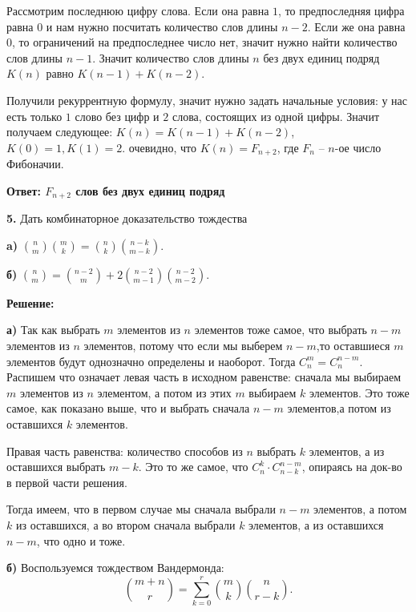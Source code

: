 \documentclass[a4paper,12pt]{article} %
\begin{document}
Рассмотрим последнюю цифру слова. Если она равна $1$, то предпоследняя цифра равна $0$ и нам нужно посчитать количество слов длины $n-2$. Если же она равна $0$, то ограничений на предпоследнее число нет, значит нужно найти количество слов длины $n-1$. Значит количество слов длины $n$ без двух единиц подряд $K(n)$ равно $K(n-1) + K(n-2)$.

Получили рекуррентную формулу, значит нужно задать начальные условия: у нас есть только $1$ слово без цифр и $2$ слова, состоящих из одной цифры. Значит получаем следующее: $K(n) = K(n-1) + K(n-2)$, $K(0) = 1, K(1) = 2$. очевидно, что $K(n) = F_{n+2}$, где $F_n$ -- $n$-ое число Фибоначии.


\begin{flushright}
\begin{large}
\textbf {Ответ: $F_{n+2}$ слов без двух единиц подряд}
\end{large}
\end{flushright}

{\bf 5.} Дать комбинаторное доказательство тождества

{\bf a) }${{n \choose m}} {{m \choose k}} = {{n \choose k}}{{ n - k \choose m - k }}$.  

{\bf б) }${{n \choose m}} = {{n - 2 \choose m}} +2{{n - 2 \choose m - 1}} {{n - 2 \choose m - 2}}$.
\newpage
\begin{center}
\bfseries
{\Large Решение: }
\end{center}

{\bf а)} Так как выбрать $m$ элементов из $n$ элементов тоже самое, что выбрать $n-m$ элементов из $n$ элементов, потому что если мы выберем $n-m$,то оставшиеся $m$ элементов будут однозначно определены и наоборот. Тогда $C^m_n = C^{n - m}_n$. Распишем что означает левая часть в исходном равенстве: сначала мы выбираем $m$ элементов из $n$ элементом, а потом из этих $m$ выбираем $k$ элементов. Это тоже самое, как показано выше, что и выбрать сначала $n-m$ элементов,а потом из оставшихся $k$ элементов.

Правая часть равенства: количество способов из $n$ выбрать $k$ элементов, а из оставшихся выбрать $m - k$. Это то же самое, что $C^k_n\cdot C^{n-m}_{n-k}$, опираясь на док-во в первой части решения.

Тогда имеем, что в первом случае мы сначала выбрали $n-m$ элементов, а потом $k$ из оставшихся, а во втором сначала выбрали $k$ элементов, а из оставшихся $n-m$, что одно и тоже.


{\bf б)} Воспользуемся тождеством Вандермонда: \[ {{m+n \choose r}=\sum _{k=0}^{r}{m \choose k}{n \choose r-k}}.\]
\end{document}
